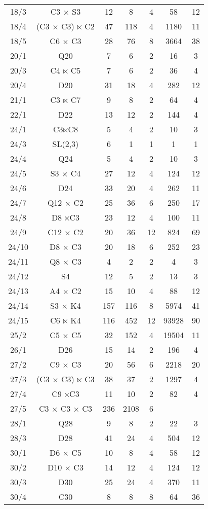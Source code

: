 \documentclass[a4paper,11pt]{article}
\theoremstyle{plain}
\theoremstyle{definition}
\begin{document}
\begin{longtable}{ccccccc}
	18/3 & C3 $\times $ S3 & 12 & 8 & 4 & 58 & 12 \\ 
	18/4 & (C3 $\times $ C3) $\ltimes $ C2 & 47 & 118 & 4 & 1180 & 11 \\ 
	18/5 & C6 $\times $ C3 & 28 & 76 & 8 & 3664 & 38 \\ 
	20/1 & Q20 & 7 & 6 & 2 & 16 & 3 \\ 
	20/3 & C4 $\ltimes $ C5 & 7 & 6 & 2 & 36 & 4 \\ 
	20/4 & D20 & 31 & 18 & 4 & 282 & 12 \\ 
	21/1 & C3 $\ltimes $ C7 & 9 & 8 & 2 & 64 & 4 \\ 
	22/1 & D22 & 13 & 12 & 2 & 144 & 4 \\ 
	24/1 & C3$\ltimes $C8 & 5 & 4 & 2 & 10 & 3 \\ 
	24/3 & SL(2,3) & 6 & 1 & 1 & 1 & 1 \\ 
	24/4 & Q24 & 5 & 4 & 2 & 10 & 3 \\ 
	24/5 & S3 $\times $ C4 & 27 & 12 & 4 & 124 & 12 \\ 
	24/6 & D24 & 33 & 20 & 4 & 262 & 11 \\ 
	24/7 & Q12 $\times $ C2 & 25 & 36 & 6 & 250 & 17 \\ 
	24/8 & D8 $\ltimes $C3 & 23 & 12 & 4 & 100 & 11 \\ 
	24/9 & C12 $\times $ C2 & 20 & 36 & 12 & 824 & 69 \\ 
	24/10 & D8 $\times $ C3 & 20 & 18 & 6 & 252 & 23 \\ 
	24/11 & Q8 $\times $ C3 & 4 & 2 & 2 & 4 & 3 \\ 
	24/12 & S4 & 12 & 5 & 2 & 13 & 3 \\ 
	24/13 & A4 $\times $ C2 & 15 & 10 & 4 & 88 & 12 \\ 
	24/14 & S3 $\times $ K4 & 157 & 116 & 8 & 5974 & 41 \\ 
	24/15 & C6 $\ltimes $ K4 & 116 & 452 & 12 & 93928 & 90 \\ 
	25/2 & C5 $\times $ C5 & 32 & 152 & 4 & 19504 & 11 \\ 
	26/1 & D26 & 15 & 14 & 2 & 196 & 4 \\ 
	27/2 & C9 $\times $ C3 & 20 & 56 & 6 & 2218 & 20 \\ 
	27/3 & (C3 $\times $ C3) $\ltimes $ C3 & 38 & 37 & 2 & 1297 & 4 \\ 
	27/4 & C9 $\ltimes $C3 & 11 & 10 & 2 & 82 & 4 \\ 
	27/5 & C3 $\times $ C3 $\times $ C3 & 236 & 2108 & 6 &  &  \\ 
	28/1 & Q28 & 9 & 8 & 2 & 22 & 3 \\ 
	28/3 & D28 & 41 & 24 & 4 & 504 & 12 \\ 
	30/1 & D6 $\times $ C5 & 10 & 8 & 4 & 58 & 12 \\ 
	30/2 & D10 $\times $ C3 & 14 & 12 & 4 & 124 & 12 \\ 
	30/3 & D30 & 25 & 24 & 4 & 370 & 11 \\ 
	30/4 & C30 & 8 & 8 & 8 & 64 & 36 \\ \hline
\end{longtable}
\end{document}
